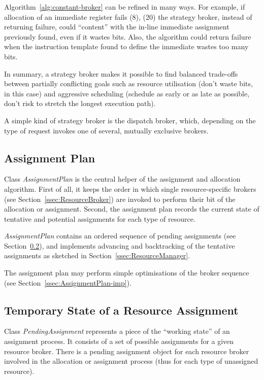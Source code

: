\documentclass[a4paper,twoside]{tce}
\begin{document}
Algorithm~\ref{alg:constant-broker} can be refined in many ways. For
example, if allocation of an immediate register fails (8), (20) the strategy
broker, instead of returning failure, could ``content'' with the in-line
immediate assignment previously found, even if it wastes bits. Also, the
algorithm could return failure when the instruction template found to define
the immediate wastes too many bits.

In summary, a strategy broker makes it possible to find balanced trade-offs
between partially conflicting goals such as resource utilisation (don't
waste bits, in this case) and aggressive scheduling (schedule as early or
as late as possible, don't risk to stretch the longest execution path).

A simple kind of strategy broker is the dispatch broker,
%
%
which, depending on the type of request invokes one of several, mutually
exclusive brokers.

\subsection{Assignment Plan}
\label{ssec:AssignmentPlan}

Class \emph{AssignmentPlan} is the central helper of the assignment and
allocation algorithm.
%
First of all, it keeps the order in which single resource-specific brokers
(see Section~\ref{ssec:ResourceBroker}) are invoked to perform their bit of
the allocation or assignment.
%
Second, the assignment plan records the current state of tentative and
potential assignments for each type of resource.

\emph{AssignmentPlan} contains an ordered sequence of pending assignments
(see Section~\ref{ssec:PendingAssignment}), and implements advancing and
backtracking of the tentative assignments as sketched in
Section~\ref{ssec:ResourceManager}.

The assignment plan may perform simple optimisations of the broker sequence
(see Section~\ref{ssec:AssignmentPlan-imp}).

\subsection{Temporary State of a Resource Assignment}
\label{ssec:PendingAssignment}

Class \emph{PendingAssignment} represents a piece of the ``working state''
of an assignment process. It consists of a set of possible assignments for a
given resource broker. There is a pending assignment object for each
resource broker involved in the allocation or assignment process (thus for
each type of unassigned resource).
\end{document}
